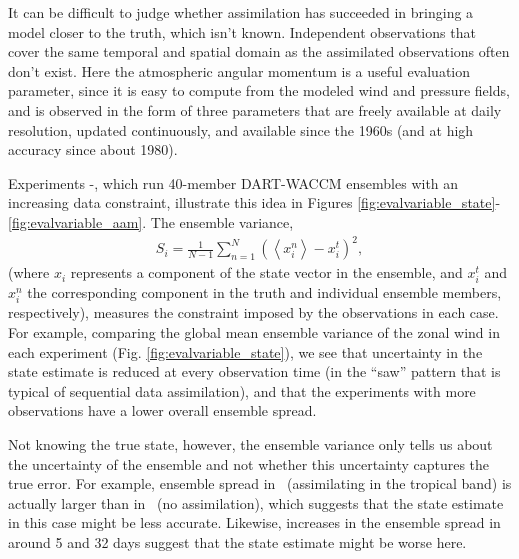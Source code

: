 It can be difficult to judge whether assimilation has succeeded in bringing a model closer to the truth, which isn't known. 
Independent observations that cover the same temporal and spatial domain as the assimilated observations often don't exist. 
Here the atmospheric angular momentum is a useful evaluation parameter, since it is easy to compute from the modeled wind and pressure fields, and is observed in the form of three parameters that are freely available at daily resolution, updated continuously, and available since the 1960s (and at high accuracy since about 1980).  

Experiments \WACCMNODA-\WACCMGLOBAL, which run 40-member DART-WACCM ensembles with an increasing data constraint, illustrate this idea in Figures \ref{fig:evalvariable_state}-\ref{fig:evalvariable_aam}.   
The ensemble variance,
\begin{eqnarray}
S_i = 
\frac{1}{N-1}
\sum_{n=1}^N
\left(
	\left< x_{i}^{n} \right>-x_i^t
\right)^2,
\label{eq:spread}
\end{eqnarray}
(where $x_{i}$ represents a component of the state vector in the ensemble,  and $x_{i}^t$ and $x_{i}^n$ the corresponding component in the truth and individual ensemble members, respectively), measures the constraint imposed by the observations in each case.
For example, comparing the global mean ensemble variance of the zonal wind in each experiment (Fig. \ref{fig:evalvariable_state}), we see that uncertainty in the state estimate is reduced at every observation time (in the ``saw'' pattern that is typical of sequential data assimilation), and that the experiments with more observations have a lower overall ensemble spread. 

Not knowing the true state, however, the ensemble variance only tells us about the uncertainty of the ensemble and not whether this uncertainty captures the true error. 
For example, ensemble spread in \WACCMTROPICS~(assimilating in the tropical band) is actually larger than in \WACCMNODA~(no assimilation), which suggests that the state estimate in this case might be less accurate. 
Likewise, increases in the ensemble spread in \WACCMGLOBAL around 5 and 32 days suggest that the state estimate might be worse here. 


